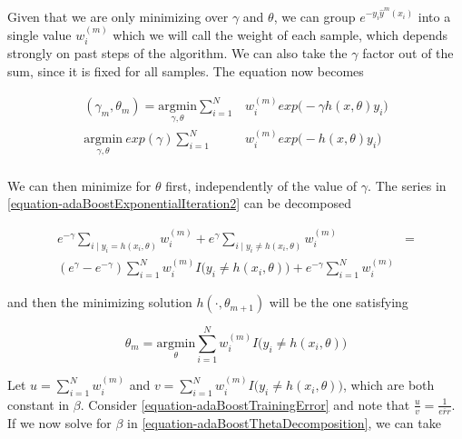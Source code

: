 Given that we are only minimizing over $\gamma$ and $\theta$, we can group $e^{-y_i  \hat{y}^{m}(x_i)}$ into a single value $w_i^{(m)}$ which we will call the weight of each sample, which depends strongly on past steps of the algorithm. We can also take the $\gamma$ factor out of the sum, since it is fixed for all samples. The equation now becomes

\begin{equation} \label{equation-adaBoostExponentialIteration2}
\begin{split}
(\gamma_{m}, \theta_{m}) = \underset{\gamma, \theta}{\mathrm{argmin}}  \sum_{i=1}^{N} &  w_i^{(m)} exp \big(- \gamma h(x,\theta)y_i \big) \\
 \underset{\gamma, \theta}{\mathrm{argmin}} \  exp(\gamma) \sum_{i=1}^{N} & w_i^{(m)} exp \big( - h(x,\theta)y_i \big) \\
\end{split}
\end{equation}

We can then minimize for $\theta$ first, independently of the value of $\gamma$. The series in \ref{equation-adaBoostExponentialIteration2} can be decomposed 

\begin{equation} \label{equation-adaBoostThetaDecomposition}
\begin{split}
e^{-\gamma} \sum_{i \mid y_i = h(x_i,\theta)} w_i^{(m)}  + e^{\gamma} \sum_{i \mid y_i \neq h(x_i,\theta)} w_i^{(m)} & = \\
( e^{\gamma} - e^{-\gamma}) \sum_{i = 1}^{N} w_i^{(m)} I \big( y_i \neq h(x_i,\theta)   \big)  + e^{-\gamma} \sum_{i = 1}^{N}   w_i^{(m)} &
\end{split}
\end{equation}


and then the minimizing solution $h(\cdot, \theta_{m+1})$ will be the one satisfying

 \begin{equation} \label{equation-adaBoostThetaMinimization}
  \theta_{m} = \underset{ \theta}{\mathrm{argmin}}  \sum_{i=1}^{N}  w_i^{(m)} I \big( y_i \neq h(x_i,\theta)   \big) 
 \end{equation}

Let $u = \sum_{i=1}^{N}  w_i^{(m)}$ and $v = \sum_{i=1}^{N}  w_i^{(m)} I \big( y_i \neq h(x_i,\theta)   \big) $, which are both constant in $\beta$. Consider \ref{equation-adaBoostTrainingError} and note that $\frac{u}{v} = \frac{1}{\overline{err}}$. If we now solve for $\beta$ in \ref{equation-adaBoostThetaDecomposition}, we can take

